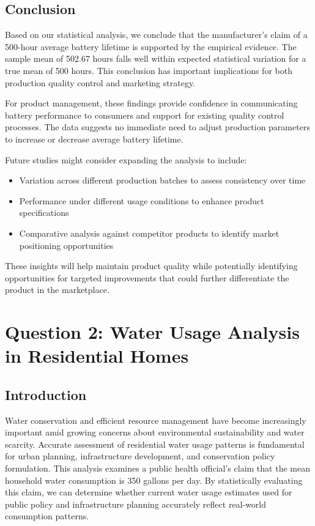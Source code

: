 \documentclass[12pt]{article}
\begin{document}
\subsection{Conclusion}
Based on our statistical analysis, we conclude that the manufacturer's claim of a 500-hour average battery lifetime is supported by the empirical evidence. The sample mean of 502.67 hours falls well within expected statistical variation for a true mean of 500 hours. This conclusion has important implications for both production quality control and marketing strategy.

For product management, these findings provide confidence in communicating battery performance to consumers and support for existing quality control processes. The data suggests no immediate need to adjust production parameters to increase or decrease average battery lifetime.

Future studies might consider expanding the analysis to include:
\begin{itemize}
    \item Variation across different production batches to assess consistency over time
    \item Performance under different usage conditions to enhance product specifications
    \item Comparative analysis against competitor products to identify market positioning opportunities
\end{itemize}

These insights will help maintain product quality while potentially identifying opportunities for targeted improvements that could further differentiate the product in the marketplace.
\newpage
\section{Question 2: Water Usage Analysis in Residential Homes}

\subsection{Introduction}
Water conservation and efficient resource management have become increasingly important amid growing concerns about environmental sustainability and water scarcity. Accurate assessment of residential water usage patterns is fundamental for urban planning, infrastructure development, and conservation policy formulation. This analysis examines a public health official's claim that the mean household water consumption is 350 gallons per day. By statistically evaluating this claim, we can determine whether current water usage estimates used for public policy and infrastructure planning accurately reflect real-world consumption patterns.
\end{document}
